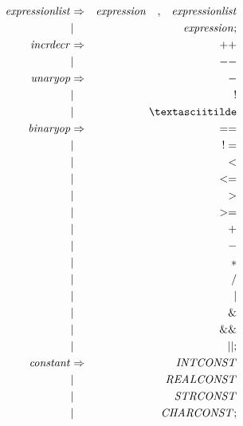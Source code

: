 \documentclass{article}
\begin{document}
\begin{eqnarray}
    \mathit{expressionlist} & \Rightarrow & \mathit{expression}\quad \mathit{,}\quad\mathit{expressionlist}\\
    & | & \mathit{expression};\\
    \mathit{incrdecr} & \Rightarrow & \mathit{++} \\
    & | & \mathit{--}\\
    \mathit{unaryop} & \Rightarrow & \mathit{-} \\
    & | & \mathit{!}\\
    & | & \mathit{\textasciitilde}\\
    \mathit{binaryop} & \Rightarrow & \mathit{==} \\
    & | & \mathit{!=}\\
    & | & \mathit{<} \\
    & | & \mathit{<=}\\
    & | & \mathit{>}\\
    & | & \mathit{>=}\\
    & | & \mathit{+}\\
    & | & \mathit{-}\\
    & | & \mathit{*}\\
    & | & \mathit{/}\\
    & | & \mathit{|}\\
    & | & \mathit{\&}\\
    & | & \mathit{\&\&}\\
    & | & \mathit{||};\\
    \mathit{constant} & \Rightarrow & \mathit{INTCONST}\\
    & | &\mathit{REALCONST}\\
    & | &\mathit{STRCONST}\\
    & | &\mathit{CHARCONST};
\end{eqnarray}
\end{document}
